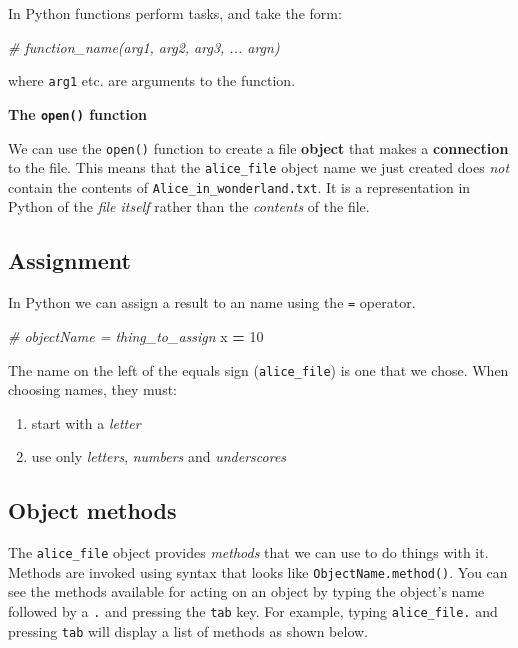 \documentclass[]{book}
\newenvironment{Shaded}{\begin{snugshade}}{\end{snugshade}}
\newcommand{\CommentTok}[1]{\textcolor[rgb]{0.56,0.35,0.01}{\textit{#1}}}
\newcommand{\DecValTok}[1]{\textcolor[rgb]{0.00,0.00,0.81}{#1}}
\newcommand{\NormalTok}[1]{#1}
\newcommand{\OperatorTok}[1]{\textcolor[rgb]{0.81,0.36,0.00}{\textbf{#1}}}
\providecommand{\tightlist}{%
  \setlength{\itemsep}{0pt}\setlength{\parskip}{0pt}}
\begin{document}
In Python functions perform tasks, and take the form:

\begin{Shaded}
\begin{Highlighting}[]
\CommentTok{# function_name(arg1, arg2, arg3, ... argn)}
\end{Highlighting}
\end{Shaded}

where \texttt{arg1} etc. are arguments to the function.

\textbf{The \texttt{open()} function}

We can use the \texttt{open()} function to create a file \textbf{object} that makes a \textbf{connection} to the file. This means that the \texttt{alice\_file} object name we just created does \emph{not} contain the contents of \texttt{Alice\_in\_wonderland.txt}. It is a representation in Python of the \emph{file itself} rather than the \emph{contents} of the file.

\hypertarget{assignment-1}{%
\subsection{Assignment}\label{assignment-1}}

In Python we can assign a result to an name using the \texttt{=} operator.

\begin{Shaded}
\begin{Highlighting}[]
\CommentTok{# objectName = thing_to_assign}
\NormalTok{x }\OperatorTok{=} \DecValTok{10}
\end{Highlighting}
\end{Shaded}

The name on the left of the equals sign (\texttt{alice\_file}) is one that we chose. When choosing names, they must:

\begin{enumerate}
\def\labelenumi{\arabic{enumi}.}
\tightlist
\item
  start with a \emph{letter}
\item
  use only \emph{letters}, \emph{numbers} and \emph{underscores}
\end{enumerate}

\hypertarget{object-methods}{%
\subsection{Object methods}\label{object-methods}}

The \texttt{alice\_file} object provides \emph{methods} that we can use to do things with it. Methods are invoked using syntax that looks like \texttt{ObjectName.method()}. You can see the methods available for acting on an object by typing the object's name followed by a \texttt{.} and pressing the \texttt{tab} key. For example, typing \texttt{alice\_file.} and pressing \texttt{tab} will display a list of methods as shown below.
\end{document}
